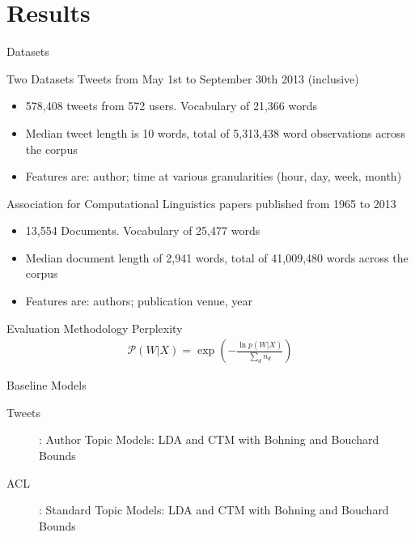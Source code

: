 \documentclass[xcolor=dvipsnames]{beamer}
\begin{document}

\section{Results}
\begin{frame}{Datasets}

Two Datasets
Tweets from May 1st to September 30th 2013 (inclusive)
\begin{itemize}
    \item 578,408 tweets from 572 users. Vocabulary of 21,366 words
    \item Median tweet length is 10 words, total of 5,313,438 word observations across the corpus 
    \item Features are: author; time at various granularities (hour, day, week, month)
\end{itemize}

Association for Computational Linguistics papers published from 1965 to 2013
\begin{itemize}
    \item 13,554 Documents. Vocabulary of 25,477 words
    \item Median document length of 2,941 words, total of 41,009,480 words across the corpus
    \item Features are: authors; publication venue, year
\end{itemize}

\end{frame}

\begin{frame}{Evaluation Methodology}
 {
    Perplexity
    \begin{align*}
    \mathcal{P}(W|X) = \exp \left( - \frac{\ln p(W|X)}{\sum_d n_d}   \right)
    \end{align*}
}
 {
Baseline Models
\begin{description}
\item[Tweets]: Author Topic Models: LDA and CTM with Bohning and Bouchard Bounds
\item[ACL]: Standard Topic Models: LDA and CTM with Bohning and Bouchard Bounds
\end{description}

}

\end{frame}
\end{document}
